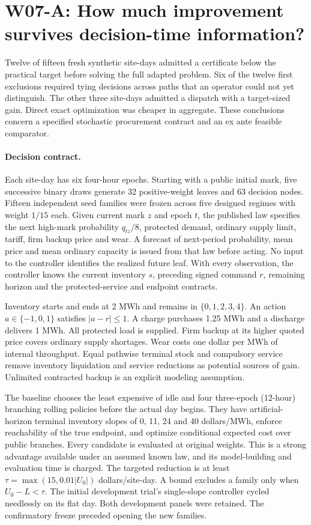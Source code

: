 \documentclass[11pt,letterpaper]{article}
\begin{document}
\section{W07-A: How much improvement survives decision-time information?}

Twelve of fifteen fresh synthetic site-days admitted a certificate below the practical target before solving the full adapted problem. Six of the twelve first exclusions required tying decisions across paths that an operator could not yet distinguish. The other three site-days admitted a dispatch with a target-sized gain. Direct exact optimization was cheaper in aggregate. These conclusions concern a specified stochastic procurement contract and an ex ante feasible comparator.

\paragraph{Decision contract.}
Each site-day has six four-hour epochs. Starting with a public initial mark, five successive binary draws generate 32 positive-weight leaves and 63 decision nodes. Fifteen independent seed families were frozen across five designed regimes with weight $1/15$ each. Given current mark $z$ and epoch $t$, the published law specifies the next high-mark probability $q_{tz}/8$, protected demand, ordinary supply limit, tariff, firm backup price and wear. A forecast of next-period probability, mean price and mean ordinary capacity is issued from that law before acting. No input to the controller identifies the realized future leaf. With every observation, the controller knows the current inventory $s$, preceding signed command $r$, remaining horizon and the protected-service and endpoint contracts.

Inventory starts and ends at 2 MWh and remains in $\{0,1,2,3,4\}$. An action $a\in\{-1,0,1\}$ satisfies $|a-r|\leq1$. A charge purchases 1.25 MWh and a discharge delivers 1 MWh. All protected load is supplied. Firm backup at its higher quoted price covers ordinary supply shortages. Wear costs one dollar per MWh of internal throughput. Equal pathwise terminal stock and compulsory service remove inventory liquidation and service reductions as potential sources of gain. Unlimited contracted backup is an explicit modeling assumption.

The baseline chooses the least expensive of idle and four three-epoch (12-hour) branching rolling policies before the actual day begins. They have artificial-horizon terminal inventory slopes of 0, 11, 24 and 40 dollars/MWh, enforce reachability of the true endpoint, and optimize conditional expected cost over public branches. Every candidate is evaluated at original weights. This is a strong advantage available under an assumed known law, and its model-building and evaluation time is charged. The targeted reduction is at least $\tau=\max(15,0.01|U_0|)$ dollars/site-day. A bound excludes a family only when $U_0-L<\tau$. The initial development trial's single-slope controller cycled needlessly on its flat day. Both development panels were retained. The confirmatory freeze preceded opening the new families.
\end{document}
